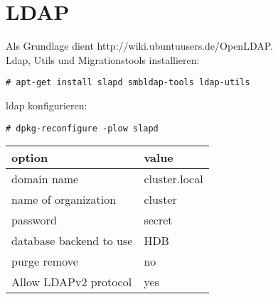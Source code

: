 \chapter{LDAP}
Als Grundlage dient http://wiki.ubuntuusers.de/OpenLDAP.\\
Ldap, Utils und Migrationstools installieren:
\begin{lstlisting}[style=Bash]
# apt-get install slapd smbldap-tools ldap-utils
\end{lstlisting}
ldap konfigurieren:
\begin{lstlisting}[style=Bash]
# dpkg-reconfigure -plow slapd
\end{lstlisting}
\begin{tabular}{ l | l }
 option & value\\
 \hline
 domain name & cluster.local\\
 name of organization & cluster\\
 password & secret\\
 database backend to use & HDB\\
 purge remove & no\\
 Allow LDAPv2 protocol & yes\\
\end{tabular}
